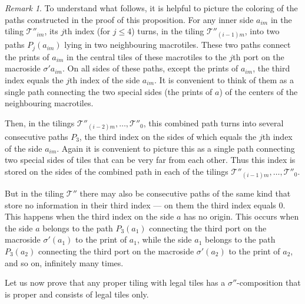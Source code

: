 \documentclass[12pt]{article}
\theoremstyle{remark}
\newtheorem{remark}{Remark}
\begin{document}
\begin{remark}
To understand what follows, it is helpful to picture the coloring of the paths
constructed in the proof of this proposition. For any inner side $a_{im}$ in the tiling $\mathcal T''_{im}$,
its $j$th index (for $j\le4$) turns, in the tiling $\mathcal T''_{(i-1)m}$,
into two paths $P_j(a_{im})$ lying in two neighbouring macrotiles. These two paths connect
the prints of $a_{im}$ in the central tiles of these macrotiles to the $j$th port on the macroside $\sigma' a_{im}$.
On all sides of these paths, except the prints of $a_{im}$, the third index equals the $j$th index of the side $a_{im}$.
It is convenient to think of them as a single path connecting the two special sides
(the prints of $a$) of the centers of the neighbouring macrotiles.

Then, in the tilings $\mathcal T''_{(i-2)m},\dots,\mathcal T''_{0}$, this combined path turns
into several consecutive paths $P_3$, the third index on the sides of which equals the $j$th index of the side $a_{im}$.
Again it is convenient to picture this as a single path connecting two special sides of tiles
that can be very far from each other.
Thus this index is stored on the sides of the combined path in each of the tilings
$\mathcal T''_{(i-1)m},\dots,\mathcal T''_{0}$.

But in the tiling $\mathcal T''$ there may also be consecutive paths of the same kind that store
no information in their third index --- on them the third index equals $0$. This happens when
the third index on the side $a$ has no origin. This occurs when the side $a$ belongs to the path $P_3(a_1)$
connecting the third port on the macroside $\sigma'(a_1)$ to the print of $a_1$, while the side $a_1$
belongs to the path $P_3(a_2)$ connecting the third port on the macroside $\sigma'(a_2)$ to the print of $a_2$,
and so on, infinitely many times. 
\end{remark}



Let us now prove that any proper tiling with legal tiles has a $\sigma''$-composition
that is proper and consists of legal tiles only.
\end{document}

